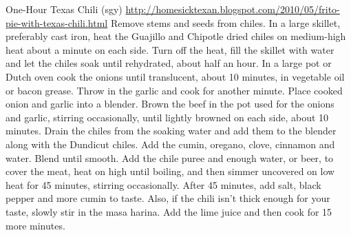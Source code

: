 \begin{recipe}{One-Hour Texas Chili (sgy)}{}{}
\freeform \url{http://homesicktexan.blogspot.com/2010/05/frito-pie-with-texas-chili.html}
Remove stems and seeds from chiles.  In a large skillet, preferably cast iron, heat the Guajillo and Chipotle dried chiles on medium-high heat about a minute on each side. Turn off the heat, fill the skillet with water and let the chiles soak until rehydrated, about half an hour.
In a large pot or Dutch oven cook the onions until translucent, about 10 minutes, in vegetable oil or bacon grease. Throw in the garlic and cook for another minute. Place cooked onion and garlic into a blender.
Brown the beef in the pot used for the onions and garlic, stirring occasionally, until lightly browned on each side, about 10 minutes.
Drain the chiles from the soaking water and add them to the blender along with the Dundicut chiles. Add the cumin, oregano, clove, cinnamon and water. Blend until smooth.
Add the chile puree and enough water, or beer, to cover the meat, heat on high until boiling, and then simmer uncovered on low heat for 45 minutes, stirring occasionally.
After 45 minutes, add salt, black pepper and more cumin to taste. Also, if the chili isn't thick enough for your taste, slowly stir in the masa harina.  Add the lime juice and then cook for 15 more minutes.
\end{recipe}

